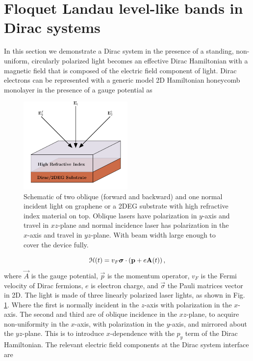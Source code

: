 \section{Floquet Landau level-like bands in Dirac systems}
In this section we demonstrate a Dirac system in the presence of a standing, non-uniform, circularly polarized light becomes an effective Dirac Hamiltonian with a magnetic field that is composed of the electric field component of light.
Dirac electrons can be represented with a generic model 2D Hamiltonian honeycomb monolayer in the presence of a gauge potential as

\begin{figure}
  \includegraphics[width=0.5\textwidth]{./figures/fll-setup.pdf}
  \caption{Schematic of two oblique (forward and backward) and one normal incident light on graphene or a 2DEG substrate with high refractive index material on top. Oblique lasers have polarization in $y$-axis and travel in $xz$-plane and normal incidence laser has polarization in the $x$-axis and travel in $yz$-plane. With beam width large enough to cover the device fully.}
  \label{fig:fll-setup}
\end{figure}

\begin{equation}\label{eq:HDirac}
  \mathcal{H}(t) = v_{F} \bm{\sigma} \cdot \left(\mathbf{p} + e\mathbf{A}(t)\right),
\end{equation}
where $\vec{A}$ is the gauge potential, $\vec{p}$ is the momentum operator, $v_F$ is the Fermi velocity of Dirac fermions, $e$ is electron charge, and $\vec{\sigma}$ the Pauli matrices vector in 2D.
The light is made of three linearly polarized laser lights, as shown in Fig. \ref{fig:fll-setup}.
Where the first is normally incident in the $z$-axis with polarization in the $x$-axis.
The second and third are of oblique incidence in the $xz$-plane, to acquire non-uniformity in the $x$-axis, with polarization in the $y$-axis, and mirrored about the $yz$-plane.
This is to introduce $x$-dependence with the $p_y$ term of the Dirac Hamiltonian.
The relevant electric field components at the Dirac system interface are

